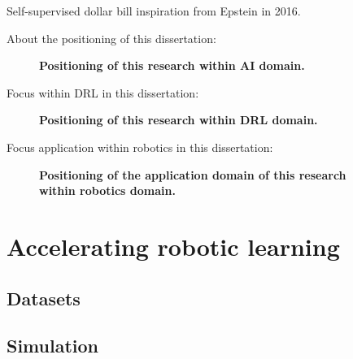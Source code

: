 \documentclass[\home/main.tex]{subfiles}
\begin{document}
Self-supervised dollar bill inspiration from Epstein in 2016.


About the positioning of this dissertation:
\begin{figure}[htbp!]
    \centering
    
    
    \caption{\textbf{Positioning of this research within AI domain.}}
    \label{fig:venn_positioning_thesis}
\end{figure}

Focus within \gls{DRL} in this dissertation:
\begin{figure}[htb]
    \centering
        
    \caption{\textbf{Positioning of this research within DRL domain.}}
    \label{fig:RL_loop_positioning}
\end{figure}

Focus application within robotics in this dissertation:
\begin{figure}[htb]
    \centering
        
    \caption{\textbf{Positioning of the application domain of this research within robotics domain.}}
    \label{fig:RL_loop_positioning}
\end{figure}

\section{Accelerating robotic learning}
\subsection{Datasets}
\subsection{Simulation}
\end{document}
